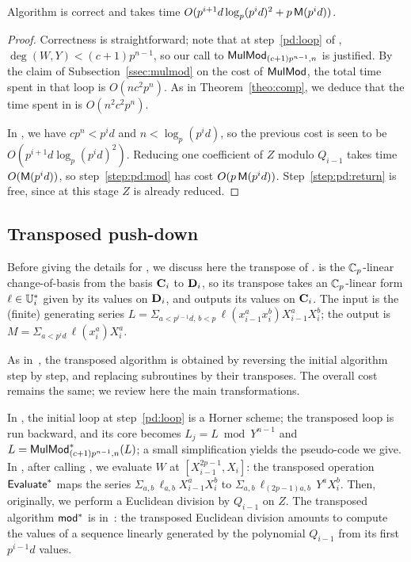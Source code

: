 \begin{proposition}\label{prop:pd}
  Algorithm  is correct and takes time $O(p^{i+1}d
  \log_p(p^id)^2 + p\,\mathrm{\sf M}(p^id))$.
\end{proposition}
\begin{proof} Correctness is straightforward; note that at
step~\ref{pd:loop} of , $\deg(W,Y) <
(c+1)p^{n-1}$, so our call to ${\sf MulMod}_{(c+1)p^{n-1},n}$ is
justified. By the claim of Subsection~\ref{ssec:mulmod} on the cost of
${\sf MulMod}$, the total time spent in that loop is $O(nc^2p^n)$. As
in Theorem~\ref{theo:comp}, we deduce that the time spent in
 is $O(n^2c^2p^n)$.

In , we have $cp^n< p^id$ and $n<\log_p (p^id)$, so the
previous cost is seen to be $O(p^{i+1}d \log_p(p^id)^2)$. Reducing one
coefficient of $Z$ modulo $Q_{i-1}$ takes time $O(\mathrm{\sf M}(p^id))$, so
step~\ref{step:pd:mod} has cost
$O(p\,\mathrm{\sf M}(p^id))$. Step~\ref{step:pd:return} is free, since at this
stage $Z$ is already reduced. \end{proof}


\subsection{Transposed push-down}

Before giving the details for , we discuss here the
transpose of .   is the $\mathbb{C}_p$-linear
change-of-basis from the basis $\mathbf{C}_i$ to $\mathbf{D}_i$, so its transpose
takes an $\mathbb{C}_p$-linear form $\ell \in \mathbb{U}_i^\ast$ given by its values
on $\mathbf{D}_i$, and outputs its values on $\mathbf{C}_i$. The input is the
(finite) generating series $L=\Sigma_{a < p^{i-1}d,\, b < p}\,
\ell(x_{i-1}^ax_i^b)X_{i-1}^aX_i^b$; the output is $M=\Sigma_{a <
  p^id}\, \ell(x_i^a)X_i^a$.

As in~\cite{BoLeSc03}, the transposed algorithm is obtained by
reversing the initial algorithm step by step, and replacing
subroutines by their transposes. The overall cost remains the same; we
review here the main transformations.

In , the initial loop at step~\ref{pd:loop} is a
Horner scheme; the transposed loop is run backward, and its core
becomes $L_j=L\bmod Y^{n-1}$ and
$L={\sf MulMod}_{(c+1)p^{n-1},n}^\ast(L)$; a small simplification
yields the pseudo-code we give.  In , after calling
, we evaluate $W$ at $[X_{i-1}^{2p-1},X_i]$: the
transposed operation ${\sf Evaluate}^\ast$ maps the series
$\Sigma_{a,b}\, \ell_{a,b} X_{i-1}^a X_i^b$ to $\Sigma_{a,b}\,
\ell_{(2p-1)a,b}\, Y^a X_i^b$. Then, originally, we perform a
Euclidean division by $Q_{i-1}$ on $Z$. The transposed algorithm
$\sf mod^\ast$ is in~\cite[Sect.~5.2]{BoLeSc03}: the transposed
Euclidean division amounts to compute the values of a sequence
linearly generated by the polynomial $Q_{i-1}$ from its first
$p^{i-1}d$ values.


